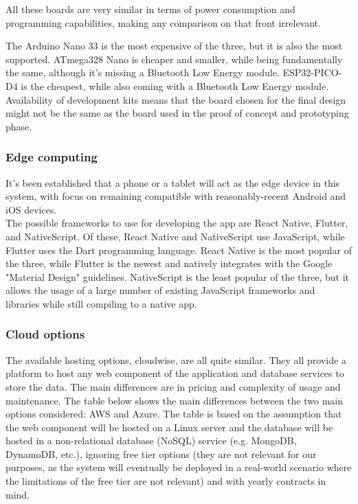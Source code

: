 All these boards are very similar in terms of power consumption and programming
capabilities, making any comparison on that front irrelevant.

The Arduino Nano 33 is the most expensive of the three, but it is also the most
supported. ATmega328 Nano is cheaper and smaller, while being fundamentally the
same, although it's missing a Bluetooth Low Energy module. ESP32-PICO-D4 is the
cheapest, while also coming with a Bluetooth Low Energy module. Availability of
development kits means that the board chosen for the final design might not be the
same as the board used in the proof of concept and prototyping phase. \\

\subsubsection{Edge computing}
It's been established that a phone or a tablet will act as the edge device in this
system, with focus on remaining compatible with reasonably-recent Android and iOS
devices. \\
The possible frameworks to use for developing the app are React Native, Flutter,
and NativeScript. Of these, React Native and NativeScript use JavaScript, while
Flutter uses the Dart programming language. React Native is the most popular of
the three, while Flutter is the newest and natively integrates with the Google
"Material Design" guidelines. NativeScript is the least popular of the three, but
it allows the usage of a large number of existing JavaScript frameworks and libraries
while still compiling to a native app. \\

\subsubsection{Cloud options}
The available hosting options, cloudwise, are all quite similar. They all
provide a platform to host any web component of the application and database services
to store the data. The main differences are in pricing and complexity of usage and
maintenance. The table below shows the main differences between the two main
options considered: AWS and Azure. The table is based on the assumption
that the web component will be hosted on a Linux server and the database will be
hosted in a non-relational database (NoSQL) service (e.g. MongoDB, DynamoDB, etc.),
ignoring free tier options (they are not relevant for our purposes, as the system will
eventually be deployed in a real-world scenario where the limitations of the free
tier are not relevant) and with yearly contracts in mind.

